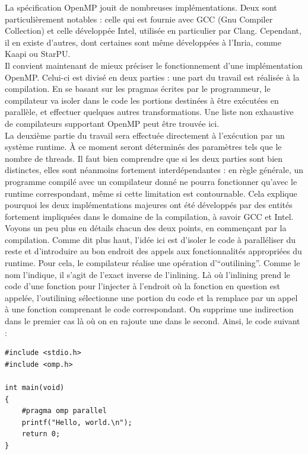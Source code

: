 \documentclass{report}
\begin{document}
La spécification OpenMP jouit de nombreuses implémentations. Deux sont particulièrement notables : celle
qui est fournie avec GCC (Gnu Compiler Collection) et celle développée Intel, utilisée en particulier
par Clang. Cependant, il en existe d'autres, dont certaines sont même développées à l'Inria, comme Kaapi
ou StarPU.
\\Il convient maintenant de mieux préciser le fonctionnement d'une implémentation OpenMP. Celui-ci est
divisé en deux parties : une part du travail est réalisée à la compilation. En se basant sur les pragmas
écrites par le programmeur, le compilateur va isoler dans le code les portions destinées à être exécutées
en parallèle, et effectuer quelques autres transformations. Une liste non exhaustive de compilateurs
supportant OpenMP peut être trouvée ici\cite{ompcompiler}.
\\ La deuxième partie du travail sera effectuée directement à l'exécution par un système runtime. À ce 
moment seront déterminés des paramètres tels que le nombre de threads. Il faut bien comprendre que si les
deux parties sont bien distinctes, elles sont néanmoins fortement interdépendantes : en règle générale,
un programme compilé avec un compilateur donné ne pourra fonctionner qu'avec le runtime correspondant,
même si cette limitation est contournable. Cela explique pourquoi les deux implémentations majeures ont
été développés par des entités fortement impliquées dans le domaine de la  compilation, à 
savoir GCC et Intel. 
\\Voyons un peu plus en détails chacun des deux points, en commençant par la compilation. Comme dit plus
haut, l'idée ici est d'isoler le code à paralléliser du reste et d'introduire au bon endroit des appels
aux fonctionnalités appropriées du runtime. Pour cela, le compilateur réalise une opération
d'``outilining''. Comme le nom l'indique, il s'agit de l'exact inverse de l'inlining. Là où l'inlining
prend le code d'une fonction pour l'injecter à l'endroit où la fonction en question est appelée, 
l'outilining sélectionne une portion du code et la remplace par un appel à une fonction comprenant le
code correspondant. On supprime une indirection dans le premier cas là où on en rajoute une dans le 
second. Ainsi, le code suivant :
\begin{lstlisting}
#include <stdio.h>
#include <omp.h>

int main(void)
{
    #pragma omp parallel
    printf("Hello, world.\n");
    return 0;
}


\end{lstlisting}
\end{document}
